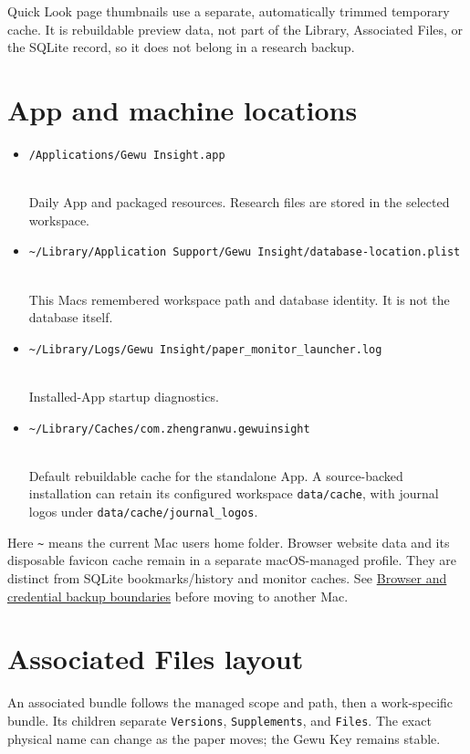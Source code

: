 \documentclass[10pt,letterpaper,oneside]{scrreprt}
\providecommand{\tightlist}{\setlength{\itemsep}{1pt}\setlength{\parskip}{0pt}}
\begin{document}
Quick Look page thumbnails use a separate, automatically trimmed temporary cache. It is rebuildable preview data, not part of the Library, Associated Files, or the SQLite record, so it does not belong in a research backup.

\section{App and machine locations}\label{app-and-machine-locations}

\begin{itemize}
\tightlist
\item
  \texttt{/Applications/Gewu\ Insight.app}\strut \\
  {Daily App and packaged resources. Research files are stored in the selected workspace.}
\item
  \texttt{\textasciitilde{}/Library/Application\ Support/Gewu\ Insight/database-location.plist}\strut \\
  {This Mac\textquotesingle s remembered workspace path and database identity. It is not the database itself.}
\item
  \texttt{\textasciitilde{}/Library/Logs/Gewu\ Insight/paper\_monitor\_launcher.log}\strut \\
  {Installed-App startup diagnostics.}
\item
  \texttt{\textasciitilde{}/Library/Caches/com.zhengranwu.gewuinsight}\strut \\
  {Default rebuildable cache for the standalone App. A source-backed installation can retain its configured workspace \nolinkurl{data/cache}, with journal logos under \nolinkurl{data/cache/journal_logos}.}
\end{itemize}

Here \texttt{\textasciitilde{}} means the current Mac user\textquotesingle s home folder. Browser website data and its disposable favicon cache remain in a separate macOS-managed profile. They are distinct from SQLite bookmarks/history and monitor caches. See \hyperref[backup-migrate]{Browser and credential backup boundaries} before moving to another Mac.

\section{Associated Files layout}\label{associated-files-layout}

An associated bundle follows the managed scope and path, then a work-specific bundle. Its children separate \texttt{Versions}, \texttt{Supplements}, and \texttt{Files}. The exact physical name can change as the paper moves; the Gewu Key remains stable.
\end{document}
